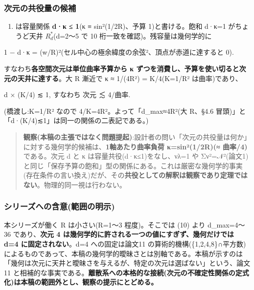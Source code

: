\documentclass[
]{ltjsarticle}
\providecommand{\tightlist}{%
  \setlength{\itemsep}{0pt}\setlength{\parskip}{0pt}}
\begin{document}
\subsubsection{次元の共役量の候補}\label{ux6b21ux5143ux306eux5171ux5f79ux91cfux306eux5019ux88dc}

\begin{enumerate}
\def\labelenumi{(\arabic{enumi})}
\setcounter{enumi}{9}
\tightlist
\item
  は容量関係 \textbf{d·κ ≤ 1}(κ ≡ sin²(1/2R)、予算 1)と書ける。飽和
  d·κ=1 がちょうど天井 \(R^{*}_{d}\)(d=2〜5 で 10
  桁一致を確認)。残容量は幾何学的に
\end{enumerate}

1 − d·κ = (w/R)²(セル中心の極余緯度の余弦²、頂点が赤道に達すると 0).

すなわち\textbf{各空間次元は単位曲率予算から κ
ずつを消費し、予算を使い切ると次元の天井に達する}。大 R 漸近で κ ≈
1/(4R²) = K/4(K=1/R² は曲率)であり、

d × (K/4) ≲ 1, すなわち 次元 ≲ 4/曲率.

(橋渡し:K=1/R² なので 4/K=4R²。よって「d\_max≈4R²(大 R、§4.6
冒頭)」と「d·(K/4)≲1」は同一の関係の二表記である。)

\begin{quote}
\textbf{観察(本稿の主張ではなく問題提起)}:設計者の問い「次元の共役量は何か」に対する幾何学的候補は、\textbf{1軸あたり曲率負荷
κ=sin²(1/2R)(≈ 曲率/4)} である。次元 d と κ
は容量共役(d·κ≤1)をなし、νλ=1 や
Σν²=𝒩²(論文1)と同じ「保存予算の飽和」型の関係にある。これは厳密な幾何学的事実(存在条件の言い換え)だが、その\textbf{共役としての解釈は観察であり定理ではない}。物理的同一視は行わない。
\end{quote}

\subsubsection{シリーズへの含意(範囲の明示)}\label{ux30b7ux30eaux30fcux30baux3078ux306eux542bux610fux7bc4ux56f2ux306eux660eux793a}

本シリーズが働く R は小さい(R=1〜3 程度)。そこでは (10) より
d\_max=4〜36 であり、\textbf{次元 4
は幾何学的に許される一つの値にすぎず、幾何だけでは d=4
に固定されない}。d=4 への固定は論文11
の算術的機構(\{1,2,4,8\}∩平方数)によるものであって、本稿の幾何学的曖昧さとは別軸である。本稿が示すのは「幾何は次元に天井と曖昧さを与えるが、特定の次元は選ばない」という、論文11
と相補的な事実である。\textbf{離散系への本格的な接続(次元の不確定性関係の定式化)は本稿の範囲外とし、観察の提示にとどめる。}
\end{document}
